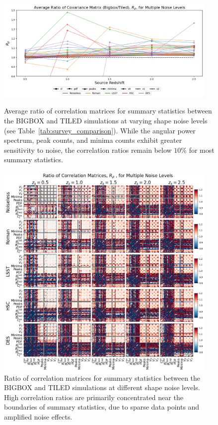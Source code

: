 \begin{figure}[p]
    \centering
    \includegraphics[width=0.95\textwidth]{figures/results/avg_corr_ratio_noise.png}
    \caption[Average BIGBOX/TILED Ratio of Correlation for Multiple Noise Levels]
    {Average ratio of correlation matrices for summary statistics between the BIGBOX and TILED simulations at varying shape noise levels (see Table~\ref{tab:survey_comparison}). While the angular power spectrum, peak counts, and minima counts exhibit greater sensitivity to noise, the correlation ratios remain below $10\%$ for most summary statistics.}
    \label{fig:avg_corr_noise}
    \includegraphics[width=0.95\textwidth]{figures/results/corr_noise.png}
    \caption[BIGBOX/TILED Ratio of Correlation for Multiple Noise Levels]
    {Ratio of correlation matrices for summary statistics between the BIGBOX and TILED simulations at different shape noise levels. High correlation ratios are primarily concentrated near the boundaries of summary statistics, due to sparse data points and amplified noise effects.}
    \label{fig:corr_noise}
\end{figure}

